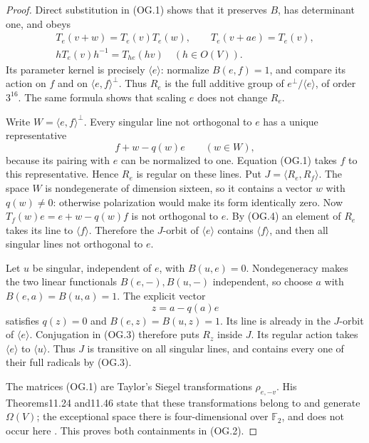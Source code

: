 \begin{proof}
Direct substitution in (OG.1) shows that it
preserves \(B\), has determinant one, and obeys
\[
 \begin{gathered}
 T_e(v+w)=T_e(v)T_e(w),\qquad
 T_e(v+ae)=T_e(v),\\
 hT_e(v)h^{-1}=T_{he}(hv)\quad(h\in O(V)).
 \end{gathered}
 \tag{OG.3}
\]
Its parameter kernel is precisely \(\langle e\rangle\):
normalize \(B(e,f)=1\), and compare its action
on \(f\) and on \(\langle e,f\rangle^\perp\).
Thus \(R_e\) is the full additive group of
\(e^\perp/\langle e\rangle\), of order \(3^{16}\).
The same formula shows that scaling \(e\)
does not change \(R_e\).

Write \(W=\langle e,f\rangle^\perp\).
Every singular line not orthogonal to \(e\)
has a unique representative
\[
                 f+w-q(w)e\qquad(w\in W),
 \tag{OG.4}
\]
because its pairing with \(e\) can be normalized
to one. Equation (OG.1) takes \(f\) to this
representative. Hence \(R_e\) is regular on
these lines.
Put \(J=\langle R_e,R_f\rangle\).
The space \(W\) is nondegenerate of dimension
sixteen, so it contains a vector \(w\) with
\(q(w)\ne0\): otherwise polarization would
make its form identically zero.
Now \(T_f(w)e=e+w-q(w)f\) is not orthogonal
to \(e\). By (OG.4) an element of \(R_e\)
takes its line to \(\langle f\rangle\).
Therefore the \(J\)-orbit of \(\langle e\rangle\)
contains \(\langle f\rangle\), and then all
singular lines not orthogonal to \(e\).

Let \(u\) be singular, independent of \(e\),
with \(B(u,e)=0\). Nondegeneracy makes the
two linear functionals \(B(e,-),B(u,-)\)
independent, so choose \(a\) with
\(B(e,a)=B(u,a)=1\). The explicit vector
\[
                   z=a-q(a)e
 \tag{OG.5}
\]
satisfies \(q(z)=0\) and
\(B(e,z)=B(u,z)=1\).
Its line is already in the \(J\)-orbit of
\(\langle e\rangle\). Conjugation in (OG.3)
therefore puts \(R_z\) inside \(J\).
Its regular action takes \(\langle e\rangle\)
to \(\langle u\rangle\).
Thus \(J\) is transitive on all singular
lines, and contains every one of their full
radicals by (OG.3).

The matrices (OG.1) are Taylor's Siegel
transformations \(\rho_{e,-v}\).
His Theorems11.24 and11.46 state that these
transformations belong to and generate
\(\Omega(V)\); the exceptional space there
is four-dimensional over \(\mathbb F_2\),
and does not occur here
\cite[pp.~150,161]{GhostTaylorClassical}.
This proves both containments in (OG.2).


\end{proof}
